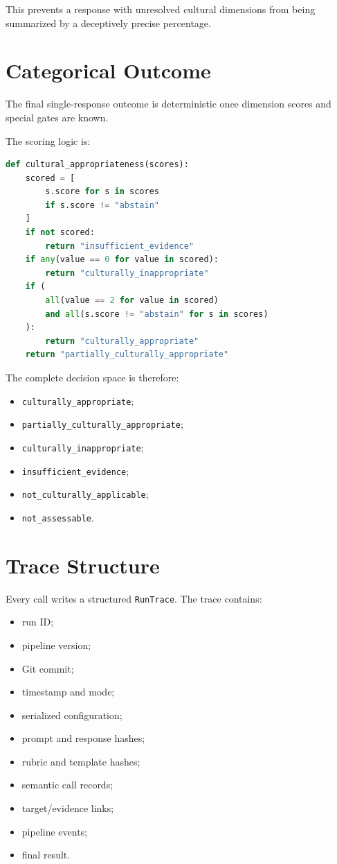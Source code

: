 This prevents a response with unresolved cultural dimensions from being summarized by a deceptively precise percentage.

\section{Categorical Outcome}

The final single-response outcome is deterministic once dimension scores and special gates are known.

The scoring logic is:

\begin{lstlisting}[language=Python,caption={Final cultural-appropriateness label.}]
def cultural_appropriateness(scores):
    scored = [
        s.score for s in scores
        if s.score != "abstain"
    ]
    if not scored:
        return "insufficient_evidence"
    if any(value == 0 for value in scored):
        return "culturally_inappropriate"
    if (
        all(value == 2 for value in scored)
        and all(s.score != "abstain" for s in scores)
    ):
        return "culturally_appropriate"
    return "partially_culturally_appropriate"
\end{lstlisting}

The complete decision space is therefore:

\begin{itemize}
\item \texttt{culturally\_appropriate};
\item \texttt{partially\_culturally\_appropriate};
\item \texttt{culturally\_inappropriate};
\item \texttt{insufficient\_evidence};
\item \texttt{not\_culturally\_applicable};
\item \texttt{not\_assessable}.
\end{itemize}

\section{Trace Structure}

Every call writes a structured \texttt{RunTrace}. The trace contains:

\begin{itemize}
\item run ID;
\item pipeline version;
\item Git commit;
\item timestamp and mode;
\item serialized configuration;
\item prompt and response hashes;
\item rubric and template hashes;
\item semantic call records;
\item target/evidence links;
\item pipeline events;
\item final result.
\end{itemize}

